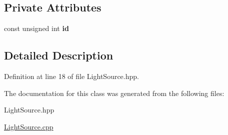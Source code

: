 \subsection*{Private Attributes}
\begin{DoxyCompactItemize}
\item 
\hypertarget{class_light_source_afe608031bd750a8ed3ea4e65c5b6e892}{const unsigned int {\bfseries id}}\label{class_light_source_afe608031bd750a8ed3ea4e65c5b6e892}

\end{DoxyCompactItemize}


\subsection{Detailed Description}


Definition at line 18 of file Light\-Source.\-hpp.



The documentation for this class was generated from the following files\-:\begin{DoxyCompactItemize}
\item 
Light\-Source.\-hpp\item 
\hyperlink{_light_source_8cpp}{Light\-Source.\-cpp}\end{DoxyCompactItemize}
